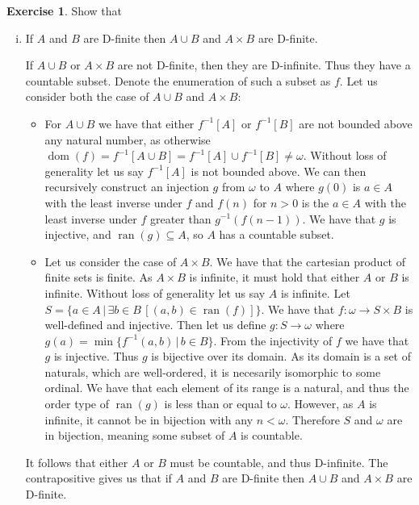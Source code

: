 \documentclass{article}
\theoremstyle{definition}
\newtheorem{exer}{Exercise}[section]
\DeclareMathOperator{\ran}{ran}
\DeclareMathOperator{\dom}{dom}
\newlength{\defparindent}
\newenvironment{answer}
    {\begin{mdframed}[backgroundcolor=gray!15, linewidth=0pt] \setlength{\parindent}{\defparindent}}
    {\end{mdframed}}
\begin{document}
\begin{exer}
    Show that 
    \begin{enumerate}[(i)]
        \item If $A$ and $B$ are D-finite then $A \cup B$ and $A \times B$ are D-finite. 
        \begin{answer}
            If $A \cup B$ or $A \times B$ are not D-finite, then they are D-infinite. Thus they have a countable subset. Denote the enumeration of such a subset as $f$. Let us consider both the case of $A \cup B$ and $A \times B$:
            \begin{itemize}
                \item For $A \cup B$ we have that either $f^{-1}[A]$ or $f^{-1}[B]$ are not bounded above any natural number, as otherwise $\dom(f) = f^{-1}[A \cup B] = f^{-1}[A]  \cup f^{-1}[B] \ne \omega$. Without loss of generality let us say $f^{-1}[A]$ is not bounded above. We can then recursively construct an injection $g$ from $\omega$ to $A$ where $g(0)$ is $a \in A$ with the least inverse under $f$ and $f(n)$ for $n > 0$ is the $a \in A$ with the least inverse under $f$ greater than $g^{-1}(f(n - 1))$. We have that $g$ is injective, and $\ran(g) \subseteq A$, so $A$ has a countable subset.
                \item Let us consider the case of $A \times B$. We have that the cartesian product of finite sets is finite. As $A \times B$ is infinite, it must hold that either $A$ or $B$ is infinite.  Without loss of generality let us say $A$ is infinite. Let $S = \{a \in A \, | \, \exists b \in B \, [(a, b) \in \ran(f)]\}$. We have that $f: \omega \to S \times B$ is well-defined and injective. Then let us define $g: S \to \omega$ where $g(a) = \min\{f^{-1}(a, b) \, | \, b \in B\}$. From the injectivity of $f$ we have that $g$ is injective. Thus $g$ is bijective over its domain. As its domain is a set of naturals, which are well-ordered, it is necesarily isomorphic to some ordinal. We have that each element of its range is a natural, and thus the order type of $\ran(g)$ is less than  or equal to $\omega$. However, as $A$ is infinite, it cannot be in bijection with any $n < \omega$. Therefore $S$ and $\omega$ are in bijection, meaning some subset of $A$ is countable.
            \end{itemize}
            It follows that either $A$ or $B$ must be countable, and thus D-infinite. The contrapositive gives us that if $A$ and $B$ are D-finite then $A \cup B$ and $A \times B$ are D-finite.
        \end{answer}

\end{enumerate}
\end{exer}
\end{document}

